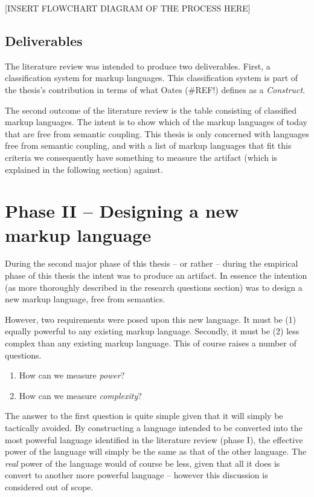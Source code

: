 \documentclass{scrreprt}
\begin{document}
[INSERT FLOWCHART DIAGRAM OF THE PROCESS HERE]


\subsection{Deliverables}
The literature review was intended to produce two deliverables. First, a classification system for markup languages. This classification system is part of the thesis's contribution in terms of what Oates (\#REF!) defines as a \emph{Construct}.

The second outcome of the literature review is the table consisting of classified markup languages. The intent is to show which of the markup languages of today that are free from semantic coupling. This thesis is only concerned with languages free from semantic coupling, and with a list of markup languages that fit this criteria we consequently have something to measure the artifact (which is explained in the following section) against.



\section{Phase II -- Designing a new markup language}
During the second major phase of this thesis -- or rather -- during the empirical phase of this thesis the intent was to produce an artifact. In essence the intention (as more thoroughly described in the research questions section) was to design a new markup language, free from semantics.

However, two requirements were posed upon this new language. It must be (1) equally powerful to any existing markup language. Secondly, it must be (2) less complex than any existing markup language. This of course raises a number of questions.



\begin{enumerate}
\item How can we measure \emph{power}?
\item How can we measure \emph{complexity}?
\end{enumerate}

The answer to the first question is quite simple given that it will simply be tactically avoided. By constructing a language intended to be converted into the most powerful language identified in the literature review (phase I), the effective power of the language will simply be the same as that of the other language. The \emph{real} power of the language would of course be less, given that all it does is convert to another more powerful language -- however this discussion is considered out of scope.
\end{document}
